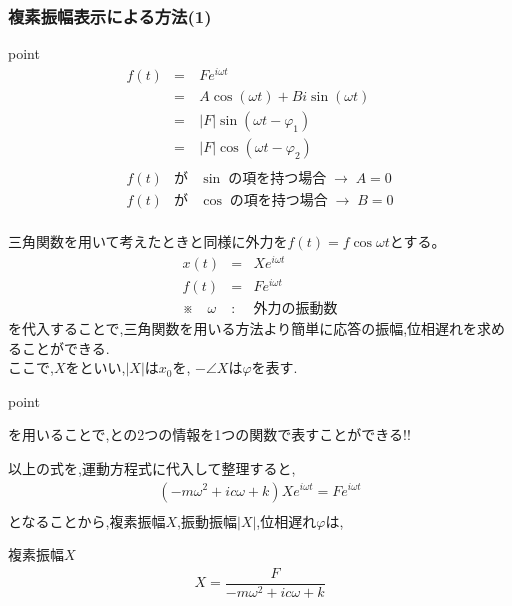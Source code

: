 \documentclass[a4paper]{jsarticle}
\begin{document}
\subsubsection{複素振幅表示による方法(1)}
\begin{itembox}[l]{point}
    \begin{eqnarray*}
        f\left(t\right)
        &=&Fe^{i\omega t}\\
        &=&A\cos\left(\omega t\right)+Bi\sin\left(\omega t\right)\\
        &=&|F|\sin\left(\omega t -\varphi_1\right)\\
        &=&|F|\cos\left(\omega t -\varphi_2\right)\\
        \\
        f\left(t\right) &が& \sin\; の項を持つ場合\; \rightarrow \; A=0\\
        f\left(t\right) &が& \cos\; の項を持つ場合\; \rightarrow \; B=0\\
    \end{eqnarray*}
\end{itembox}
三角関数を用いて考えたときと同様に外力を$f\left(t\right)=f\cos\omega t$とする。
\begin{eqnarray*}
    x\left(t\right)&=&Xe^{i\omega t}\\
    f\left(t\right)&=&Fe^{i\omega t}\\
    ※\quad\omega &:& 外力の振動数
\end{eqnarray*}
を代入することで,三角関数を用いる方法より簡単に応答の振幅,位相遅れを求めることができる.\\
ここで,$X$をといい,$|X|$は$x_0$を,
$-\angle X$は$\varphi$を表す.\\
\begin{itembox}[l]{point}
    \begin{center}
        を用いることで,との2つの情報を1つの関数で表すことができる!!
    \end{center}
\end{itembox}
以上の式を,運動方程式に代入して整理すると,\\
\begin{eqnarray*}
    \left(-m\omega^2+ic\omega+k\right)Xe^{i\omega t}=Fe^{i\omega t}\\
\end{eqnarray*}
となることから,複素振幅$X$,振動振幅$|X|$,位相遅れ$\varphi$は,
\begin{itembox}[l]{複素振幅$X$}
    \begin{eqnarray*}
        X=\dfrac{F}{-m\omega^2+ic\omega+k}\\
    \end{eqnarray*}
\end{itembox}
\end{document}
